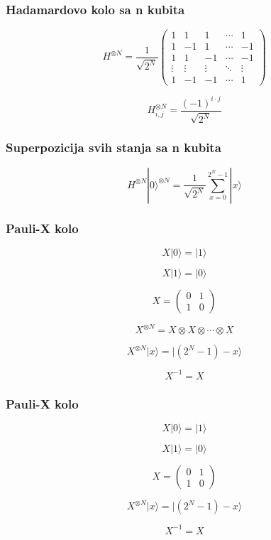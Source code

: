 \documentclass[aspectratio=169]{beamer}
\begin{document}
\begin{frame}
    \frametitle{Hadamardovo kolo sa n kubita}

    $$
H^{\otimes N} = \frac{1}{\sqrt{2^N}} \begin{pmatrix}
1 & 1 & 1 & \cdots & 1 \\
1 & -1 & 1 & \cdots & -1 \\
1 & 1 & -1 & \cdots & -1 \\
\vdots & \vdots & \vdots & \ddots & \vdots \\
1 & -1 & -1 & \cdots & 1
\end{pmatrix} $$


$$ H^{\otimes N}_{i,j} = \frac{(-1)^{i \cdot j}}{\sqrt{2^N}} $$
\end{frame}

\begin{frame}
    \frametitle{Superpozicija svih stanja sa n kubita}


    $$ H^{\otimes N} |0\rangle^{\otimes N} = \frac{1}{\sqrt{2^N}} \sum_{x=0}^{2^N-1} |x\rangle $$


\end{frame}

\begin{frame}
    \frametitle{Pauli-X kolo}


$$ X|0\rangle = |1\rangle $$

$$ X|1\rangle = |0\rangle $$


$$ X = \begin{pmatrix}
0 & 1 \\
1 & 0
\end{pmatrix} $$

$$ X^{\otimes N} = X \otimes X \otimes \cdots \otimes X $$

$$ X^{\otimes N} |x\rangle = |(2^N - 1) - x\rangle $$    

$$ X^{-1} = X $$

\end{frame}

\begin{frame}
    \frametitle{Pauli-X kolo}

$$ X|0\rangle = |1\rangle $$

$$ X|1\rangle = |0\rangle $$
    
$$ X = \begin{pmatrix}
0 & 1 \\
1 & 0
\end{pmatrix} $$

$$ X^{\otimes N} |x\rangle = |(2^N - 1) - x\rangle $$

$$ X^{-1} = X $$
\end{frame}
\end{document}
